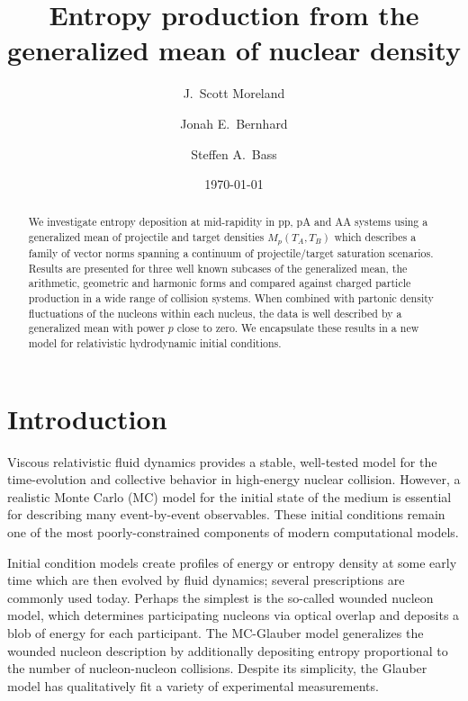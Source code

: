 \documentclass[aps,prl,reprint,amsmath,nofootinbib]{revtex4-1}
\begin{document}
\title{Entropy production from the generalized mean of nuclear density}

\author{J.\ Scott Moreland}
\author{Jonah E.\ Bernhard}
\author{Steffen A.\ Bass}

\date{\today}


\begin{abstract}
  We investigate entropy deposition at mid-rapidity in pp, pA and AA systems using a generalized mean of
  projectile and target densities $M_p(T_A,T_B)$ which describes a family of vector norms spanning a continuum
  of projectile/target saturation scenarios.  Results are presented for three well known subcases of the
  generalized mean, the arithmetic, geometric and harmonic forms and compared against charged particle
  production in a wide range of collision systems. When combined with partonic density fluctuations of the
  nucleons within each nucleus, the data is well described by a generalized mean with power $p$ close to zero.
  We encapsulate these results in a new model for relativistic hydrodynamic initial conditions.
\end{abstract}


\maketitle

\section{Introduction}

Viscous relativistic fluid dynamics provides a stable, well-tested model for the time-evolution and collective
behavior in high-energy nuclear collision.  However, a realistic Monte Carlo (MC) model for the initial state of
the medium is essential for describing many event-by-event observables.   These initial conditions remain one
of the most poorly-constrained components of modern computational models.

Initial condition models create profiles of energy or entropy density at some early time which are then
evolved by fluid dynamics; several prescriptions are commonly used today.  Perhaps the simplest is the
so-called wounded nucleon model, which determines participating nucleons via optical overlap and deposits a
blob of energy for each participant.  The MC-Glauber model generalizes the wounded nucleon description by
additionally depositing entropy proportional to the number of nucleon-nucleon collisions.  Despite its
simplicity, the Glauber model has qualitatively fit a variety of experimental measurements.
\end{document}
